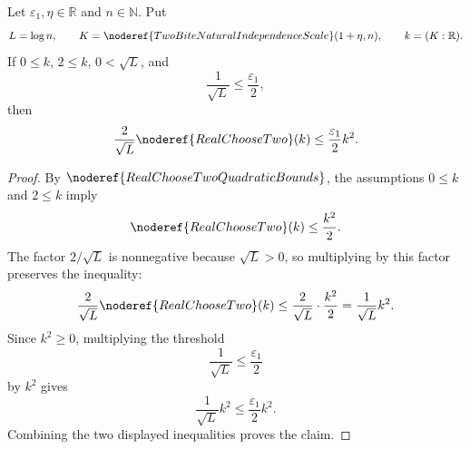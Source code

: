 \begin{helper}
Let \(\varepsilon_1,\eta\in\mathbb R\) and \(n\in\mathbb N\).  Put
\[
L=\log n,\qquad
K=\noderef{TwoBiteNaturalIndependenceScale}(1+\eta,n),\qquad k=(K:\mathbb R).
\]
If \(0\le k\), \(2\le k\), \(0<\sqrt L\), and
\[
\frac1{\sqrt L}\le\frac{\varepsilon_1}{2},
\]
then
\[
\frac2{\sqrt L}\noderef{RealChooseTwo}(k)
\le \frac{\varepsilon_1}{2}k^2.
\]
\end{helper}
\begin{proof}
By \(\noderef{RealChooseTwoQuadraticBounds}\), the assumptions \(0\le k\)
and \(2\le k\) imply
\[
\noderef{RealChooseTwo}(k)\le \frac{k^2}{2}.
\]
The factor \(2/\sqrt L\) is nonnegative because \(\sqrt L>0\), so multiplying
by this factor preserves the inequality:
\[
\frac2{\sqrt L}\noderef{RealChooseTwo}(k)
\le \frac2{\sqrt L}\cdot\frac{k^2}{2}
=\frac1{\sqrt L}k^2.
\]
Since \(k^2\ge0\), multiplying the threshold
\[
\frac1{\sqrt L}\le\frac{\varepsilon_1}{2}
\]
by \(k^2\) gives
\[
\frac1{\sqrt L}k^2\le\frac{\varepsilon_1}{2}k^2.
\]
Combining the two displayed inequalities proves the claim.
\end{proof}
